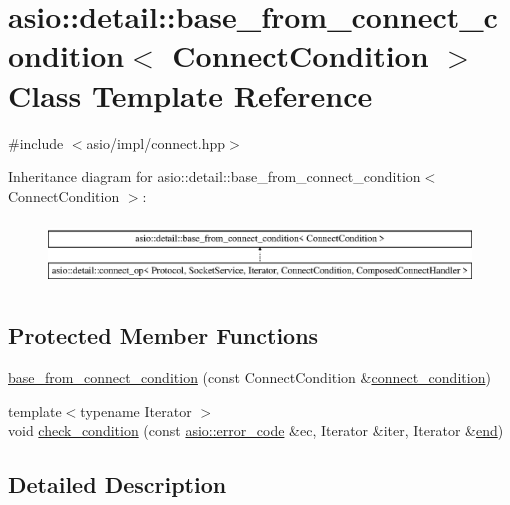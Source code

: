\hypertarget{classasio_1_1detail_1_1base__from__connect__condition}{}\section{asio\+:\+:detail\+:\+:base\+\_\+from\+\_\+connect\+\_\+condition$<$ Connect\+Condition $>$ Class Template Reference}
\label{classasio_1_1detail_1_1base__from__connect__condition}


{\ttfamily \#include $<$asio/impl/connect.\+hpp$>$}

Inheritance diagram for asio\+:\+:detail\+:\+:base\+\_\+from\+\_\+connect\+\_\+condition$<$ Connect\+Condition $>$\+:\begin{figure}[H]
\begin{center}
\leavevmode
\includegraphics[height=1.774960cm]{classasio_1_1detail_1_1base__from__connect__condition}
\end{center}
\end{figure}
\subsection*{Protected Member Functions}
\begin{DoxyCompactItemize}
\item 
\hyperlink{classasio_1_1detail_1_1base__from__connect__condition_a65abd051354634bc7b49fd49ad0f49bf}{base\+\_\+from\+\_\+connect\+\_\+condition} (const Connect\+Condition \&\hyperlink{group__async__connect_ga47e3dda205dfba3553f4c7e005897687}{connect\+\_\+condition})
\item 
{\footnotesize template$<$typename Iterator $>$ }\\void \hyperlink{classasio_1_1detail_1_1base__from__connect__condition_af96f672591fcba7426bd728286fba268}{check\+\_\+condition} (const \hyperlink{classasio_1_1error__code}{asio\+::error\+\_\+code} \&ec, Iterator \&iter, Iterator \&\hyperlink{group__async__connect_gadb6ad0193229ae84828688e812cd325c}{end})
\end{DoxyCompactItemize}


\subsection{Detailed Description}
